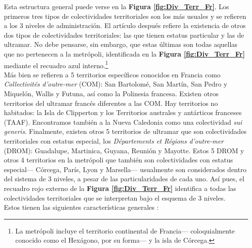Esta estructura general puede verse en la \textbf{Figura \ref{fig:Div_Terr_Fr}}. Los primeros tres tipos de colectividades territoriales son los más usuales y se refieren a los 3 niveles de administración. El artículo después refiere la existencia de otros dos tipos de colectividades territoriales: las que tienen estatus particular y las de ultramar. No debe pensarse, sin embargo, que estas últimas son todas aquellas que no pertenecen a la metrópoli, identificada en la \textbf{Figura \ref{fig:Div_Terr_Fr}} mediante el recuadro azul interno.\footnote{La metrópoli incluye el territorio continental de Francia--- coloquialmente conocido como el Hexágono, por su forma--- y la isla de Córcega.}\\ 

Más bien se refieren a 5 territorios específicos conocidos en Francia como \textit{Collectivités d'outre-mer} (COM): San Bartolomé, San Martín, San Pedro y Miquelón, Wallis y Futuna, así como la Polinesia francesa. Existen otros territorios del ultramar francés diferentes a las COM. Hay territorios no habitados: la Isla de Clipperton y los Territorios australes y antárticos franceses (TAAF). Encontramos también a la Nueva Caledonia como una colectividad \textit{sui generis}. Finalmente, existen otros 5 territorios de ultramar que son colectividades territoriales con estatus especial, los \textit{Départements et Régions d'outre-mer} (DROM): Guadalupe, Martinica, Guyana, Reunión y Mayotte. Estos 5 DROM y otros 4 territorios en la metrópoli que también son colectividades con estatus especial--- Córcega, París, Lyon y Marsella--- usualmente son considerados dentro del sistema de 3 niveles, a pesar de las particularidades de cada uno. Así pues, el recuadro rojo externo de la \textbf{Figura \ref{fig:Div_Terr_Fr}} identifica a todas las colectividades territoriales que se interpretan bajo el esquema de 3 niveles.\\

Estos tienen las siguientes características generales \parencite{AN17b}: 

